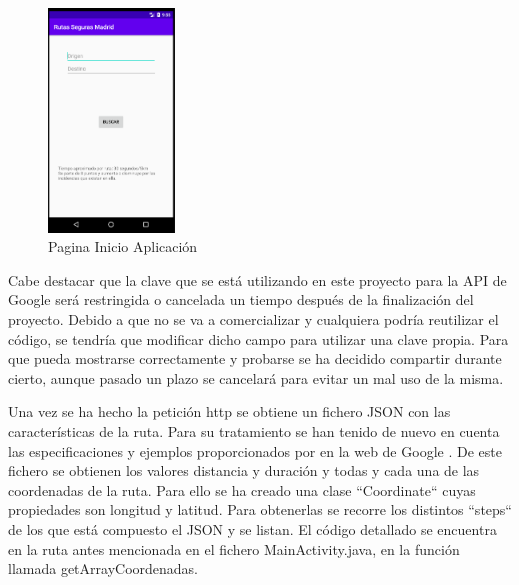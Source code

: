 \begin{figure}[h]
	\centering
	\includegraphics[angle=0, width=0.3\textwidth]{images/android/camposRuta.png}  
	
	\caption{Pagina Inicio Aplicación}
	\label{fig:diagramaOntologAccid}
\end{figure}


Cabe destacar que la clave que se está utilizando en este proyecto para la API de Google será restringida o cancelada un tiempo después de la finalización del proyecto. Debido a que no se va a comercializar y cualquiera podría reutilizar el código, se tendría que modificar dicho campo para utilizar una clave propia. Para que pueda mostrarse correctamente y probarse se ha decidido compartir durante cierto, aunque pasado un plazo se cancelará para evitar un mal uso de la misma.




Una vez se ha hecho la petición http se obtiene un fichero JSON con las características de la ruta. Para su tratamiento se han tenido de nuevo en cuenta las especificaciones y ejemplos proporcionados por en la web de Google \cite{apiDirections}.
De este fichero se obtienen los valores distancia y duración y todas y cada una de las coordenadas de la ruta. Para ello se ha creado una clase ``Coordinate`` cuyas propiedades son longitud y latitud. Para obtenerlas se recorre los distintos ``steps`` de los que está compuesto el JSON y se listan. El código detallado se encuentra en la ruta antes mencionada en el fichero MainActivity.java, en la función llamada getArrayCoordenadas.






